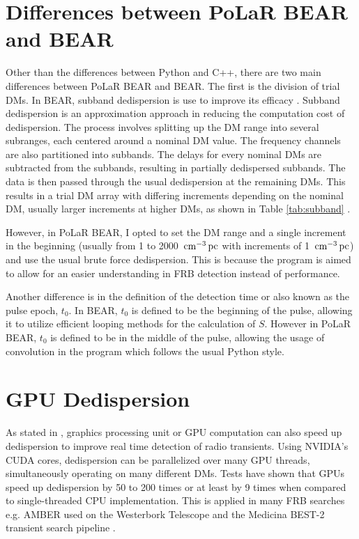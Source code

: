 \section{Differences between PoLaR BEAR and BEAR}

Other than the differences between Python and C++, there are two main differences between PoLaR BEAR and BEAR. The first is the division of trial DMs. In BEAR, subband dedispersion is use to improve its efficacy \cite{Barsdell2012}. Subband dedispersion is an approximation approach in reducing the computation cost of dedispersion. The process involves splitting up the DM range into several subranges, each centered around a nominal DM value. The frequency channels are also partitioned into subbands. The delays for every nominal DMs are subtracted from the subbands, resulting in partially dedispersed subbands. The data is then passed through the usual dedispersion at the remaining DMs. This results in a trial DM array with differing increments depending on the nominal DM, usually larger increments at higher DMs, as shown in Table \ref{tab:subband} \cite{Magro2011}.



However, in PoLaR BEAR, I opted to set the DM range and a single increment in the beginning (usually from 1 to 2000 $\,\text{cm}^{-3}\,\text{pc}$ with increments of 1 $\,\text{cm}^{-3}\,\text{pc}$) and use the usual brute force dedispersion. This is because the program is aimed to allow for an easier understanding in FRB detection instead of performance. 

Another difference is in the definition of the detection time or also known as the pulse epoch, $t_0$. In BEAR, $t_0$ is defined to be the beginning of the pulse, allowing it to utilize efficient looping methods for the calculation of $S$. However in PoLaR BEAR, $t_0$ is defined to be in the middle of the pulse, allowing the usage of convolution in the program which follows the usual Python style. 

\section{GPU Dedispersion}

As stated in , graphics processing unit or GPU computation can also speed up dedispersion to improve real time detection of radio transients. Using NVIDIA's CUDA cores, dedispersion can be parallelized over many GPU threads, simultaneously operating on many different DMs. Tests have shown that GPUs speed up dedispersion by 50 to 200 times \cite{Magro2011} or at least by 9 times \cite{Barsdell2012} when compared to single-threaded CPU implementation. This is applied in many FRB searches e.g. AMBER used on the Westerbork Telescope \cite{Sclocco2020} and the Medicina BEST-2 transient search pipeline \cite{MAGRO2013}. 

